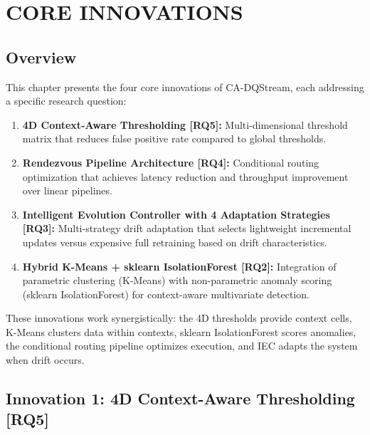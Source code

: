 \newpage
\chapter{CORE INNOVATIONS}
\pagestyle{fancy}

\section{Overview}

This chapter presents the four core innovations of CA-DQStream, each addressing a specific research question:

\begin{enumerate}
    \item \textbf{4D Context-Aware Thresholding [RQ5]:} Multi-dimensional threshold matrix that reduces false positive rate compared to global thresholds.

    \item \textbf{Rendezvous Pipeline Architecture [RQ4]:} Conditional routing optimization that achieves latency reduction and throughput improvement over linear pipelines.

    \item \textbf{Intelligent Evolution Controller with 4 Adaptation Strategies [RQ3]:} Multi-strategy drift adaptation that selects lightweight incremental updates versus expensive full retraining based on drift characteristics.

    \item \textbf{Hybrid K-Means + sklearn IsolationForest [RQ2]:} Integration of parametric clustering (K-Means) with non-parametric anomaly scoring (sklearn IsolationForest) for context-aware multivariate detection.
\end{enumerate}

These innovations work synergistically: the 4D thresholds provide context cells, K-Means clusters data within contexts, sklearn IsolationForest scores anomalies, the conditional routing pipeline optimizes execution, and IEC adapts the system when drift occurs.


\section{Innovation 1: 4D Context-Aware Thresholding [RQ5]}

